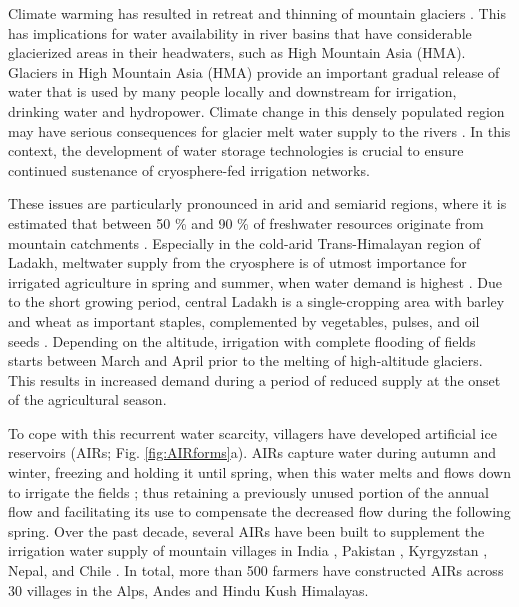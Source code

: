 \documentclass[tc, manuscript]{copernicus}
\begin{document}

\introduction

Climate warming has resulted in retreat and thinning of mountain glaciers
\citep{ipccCrossChapterPaperMountains2022}. This has implications for water availability in river basins that
have considerable glacierized areas in their headwaters, such as High Mountain Asia (HMA). Glaciers in High
Mountain Asia (HMA) provide an important gradual release of water that is used by many people locally and
downstream for irrigation, drinking water and hydropower. Climate change in this densely populated region may
have serious consequences for glacier melt water supply to the rivers
\citep{immerzeelImportanceVulnerabilityWorld2020}. In this context, the development of water storage
technologies is crucial to ensure continued sustenance of cryosphere-fed irrigation networks.

These issues are particularly pronounced in arid and semiarid regions, where it is estimated that between 50 \%
and 90 \% of freshwater resources originate from mountain catchments
\citep{mukhopadhyayReevaluationSnowmeltGlacial2015}. Especially in the cold-arid Trans-Himalayan region of
Ladakh, meltwater supply from the cryosphere is of utmost importance for irrigated agriculture in spring and
summer, when water demand is highest \citep{nusserCryosphereFedIrrigationNetworks2019}. Due to the short growing
period, central Ladakh is a single-cropping area with barley and wheat as important staples, complemented by
vegetables, pulses, and oil seeds \citep{nusserSociohydrologyArtificialGlaciers2019}. Depending on the altitude,
irrigation with complete flooding of fields starts between March and April prior to the melting of high-altitude
glaciers. This results in increased demand during a period of reduced supply at the onset of the agricultural
season.

To cope with this recurrent water scarcity, villagers have developed artificial ice reservoirs (AIRs; Fig.
\ref{fig:AIRforms}a). AIRs capture water during autumn and winter, freezing and holding it until spring, when
this water melts and flows down to irrigate the fields \citep{ipccChapterHighMountain2019, vinceGlacierMan2009,
clouseLadakhArtificialGlaciers2017, nusserSociohydrologyArtificialGlaciers2019}; thus retaining a previously
unused portion of the annual flow and facilitating its use to compensate the decreased flow during the following
spring. Over the past decade, several AIRs have been built to supplement the irrigation water supply of mountain
villages in India \citep{wangchukIceStupaCompetition2020, palmerStoringFrozenWater2022,
aggarwalAdaptationClimateChange2021}, Pakistan \citep{awazproductionIceStupaArtificial2022}, Kyrgyzstan
\citep{bbcnewsBrightArtificialGlacier2020}, Nepal, and Chile \citep{reutersConservationistsChileAim2021}. In
total, more than 500 farmers have constructed AIRs across 30 villages in the Alps, Andes and Hindu Kush
Himalayas.
\end{document}
